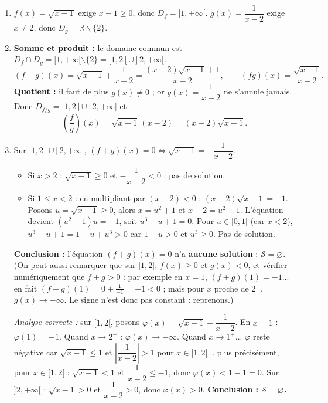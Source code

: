 \documentclass[11pt]{article}
\def\setminus{\mathbin{\backslash}}\let\smallsetminus\setminus
\begin{document}
\begin{corrige}
\begin{enumerate}
    \item $f(x)=\sqrt{x-1}$ exige $x-1 \geqslant 0$, donc $D_f=[1,+\infty[$. $g(x)=\dfrac{1}{x-2}$ exige $x \neq 2$, donc $D_g=\mathbb{R}\setminus\{2\}$.
    \item \textbf{Somme et produit :} le domaine commun est $D_f \cap D_g = [1,+\infty[ \setminus \{2\} = [1,2[ \cup ]2,+\infty[$.
    \[ (f+g)(x) = \sqrt{x-1}+\frac{1}{x-2} = \frac{(x-2)\sqrt{x-1}+1}{x-2}, \qquad (fg)(x)=\frac{\sqrt{x-1}}{x-2}. \]
    \textbf{Quotient :} il faut de plus $g(x) \neq 0$ ; or $g(x)=\dfrac{1}{x-2}$ ne s'annule jamais. Donc $D_{f/g}=[1,2[\cup]2,+\infty[$ et
    \[ \left(\frac{f}{g}\right)(x) = \sqrt{x-1}\,(x-2) = (x-2)\sqrt{x-1}. \]
    \item Sur $[1,2[\cup]2,+\infty[$, $(f+g)(x)=0 \iff \sqrt{x-1}=-\dfrac{1}{x-2}$.
    \begin{itemize}
        \item Si $x>2$ : $\sqrt{x-1} \geqslant 0$ et $-\dfrac{1}{x-2}<0$ : pas de solution.
        \item Si $1 \leqslant x < 2$ : en multipliant par $(x-2)<0$ : $(x-2)\sqrt{x-1}=-1$. Posons $u=\sqrt{x-1} \geqslant 0$, alors $x=u^2+1$ et $x-2=u^2-1$. L'équation devient $(u^2-1)u=-1$, soit $u^3-u+1=0$. Pour $u \in [0,1[$ (car $x<2$), $u^3-u+1 = 1-u+u^3 > 0$ car $1-u>0$ et $u^3 \geqslant 0$. Pas de solution.
    \end{itemize}
    \textbf{Conclusion :} l'équation $(f+g)(x)=0$ n'a \textbf{aucune solution} : $\mathcal{S}=\varnothing$. (On peut aussi remarquer que sur $[1,2[$, $f(x) \geqslant 0$ et $g(x)<0$, et vérifier numériquement que $f+g>0$ : par exemple en $x=1$, $(f+g)(1)=-1$... en fait $(f+g)(1)=0+\frac{1}{-1}=-1<0$ ; mais pour $x$ proche de $2^-$, $g(x) \to -\infty$. Le signe n'est donc pas constant : reprenons.) 
    
    \emph{Analyse correcte :} sur $[1,2[$, posons $\varphi(x)=\sqrt{x-1}+\dfrac{1}{x-2}$. En $x=1$ : $\varphi(1)=-1$. Quand $x \to 2^-$ : $\varphi(x) \to -\infty$. Quand $x \to 1^+$... $\varphi$ reste négative car $\sqrt{x-1} \leqslant 1$ et $\left|\dfrac{1}{x-2}\right|>1$ pour $x \in [1,2[$... plus précisément, pour $x \in [1,2[$ : $\sqrt{x-1}<1$ et $\dfrac{1}{x-2} \leqslant -1$, donc $\varphi(x)<1-1=0$. Sur $]2,+\infty[$ : $\sqrt{x-1}>0$ et $\dfrac{1}{x-2}>0$, donc $\varphi(x)>0$. \textbf{Conclusion : $\mathcal{S}=\varnothing$.}
\end{enumerate}
\end{corrige}
\end{document}
